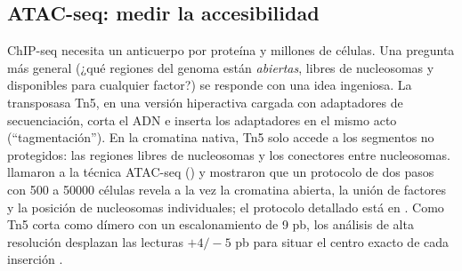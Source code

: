 \subsection{ATAC-seq: medir la accesibilidad}

ChIP-seq necesita un anticuerpo por proteína y millones de células. Una pregunta más general (¿qué regiones del genoma están \emph{abiertas}, libres de nucleosomas y disponibles para cualquier factor?) se responde con una idea ingeniosa. La transposasa Tn5, en una versión hiperactiva cargada con adaptadores de secuenciación, corta el ADN e inserta los adaptadores en el mismo acto (``tagmentación''). En la cromatina nativa, Tn5 solo accede a los segmentos no protegidos: las regiones libres de nucleosomas y los conectores entre nucleosomas. \textcite{c13-buenrostro2013} llamaron a la técnica ATAC-seq () y mostraron que un protocolo de dos pasos con 500 a \num{50000} células revela a la vez la cromatina abierta, la unión de factores y la posición de nucleosomas individuales; el protocolo detallado está en \textcite{c13-buenrostro2015}. Como Tn5 corta como dímero con un escalonamiento de 9 pb, los análisis de alta resolución desplazan las lecturas $+4/-5$ pb para situar el centro exacto de cada inserción \parencite{c13-buenrostro2013}.

